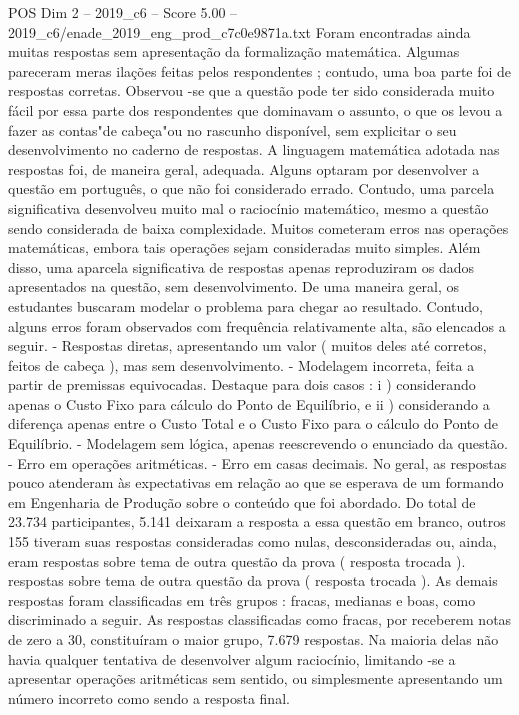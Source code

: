 \begin{textsample}{POS Dim 2 – 2019\_c6 – Score 5.00 – 2019\_c6/enade\_2019\_eng\_prod\_c7c0e9871a.txt}
Foram encontradas ainda muitas respostas sem apresentação da formalização matemática.
Algumas pareceram meras ilações feitas pelos respondentes ; contudo, uma boa parte foi de respostas corretas.
Observou -se que a questão pode ter sido considerada muito fácil por essa parte dos respondentes que dominavam o assunto, o que os levou a fazer as contas"de cabeça"ou no rascunho disponível, sem explicitar o seu desenvolvimento no caderno de respostas.
A linguagem matemática adotada nas respostas foi, de maneira geral, adequada.
Alguns optaram por desenvolver a questão em português, o que não foi considerado errado.
Contudo, uma parcela significativa desenvolveu muito mal o raciocínio matemático, mesmo a questão sendo considerada de baixa complexidade.
Muitos cometeram erros nas operações matemáticas, embora tais operações sejam consideradas muito simples.
Além disso, uma aparcela significativa de respostas apenas reproduziram os dados apresentados na questão, sem desenvolvimento.
De uma maneira geral, os estudantes buscaram modelar o problema para chegar ao resultado.
Contudo, alguns erros foram observados com frequência relativamente alta, são elencados a seguir. - Respostas diretas, apresentando um valor ( muitos deles até corretos, feitos de cabeça ), mas sem desenvolvimento. - Modelagem incorreta, feita a partir de premissas equivocadas.
Destaque para dois casos : i ) considerando apenas o Custo Fixo para cálculo do Ponto de Equilíbrio, e ii ) considerando a diferença apenas entre o Custo Total e o Custo Fixo para o cálculo do Ponto de Equilíbrio. - Modelagem sem lógica, apenas reescrevendo o enunciado da questão. - Erro em operações aritméticas. - Erro em casas decimais.
No geral, as respostas pouco atenderam às expectativas em relação ao que se esperava de um formando em Engenharia de Produção sobre o conteúdo que foi abordado.
Do total de 23.734 participantes, 5.141 deixaram a resposta a essa questão em branco, outros 155 tiveram suas respostas consideradas como nulas, desconsideradas ou, ainda, eram respostas sobre tema de outra questão da prova ( resposta trocada ). respostas sobre tema de outra questão da prova ( resposta trocada ).
As demais respostas foram classificadas em três grupos : fracas, medianas e boas, como discriminado a seguir.
As respostas classificadas como fracas, por receberem notas de zero a 30, constituíram o maior grupo, 7.679 respostas.
Na maioria delas não havia qualquer tentativa de desenvolver algum raciocínio, limitando -se a apresentar operações aritméticas sem sentido, ou simplesmente apresentando um número incorreto como sendo a resposta final.

\end{textsample}
